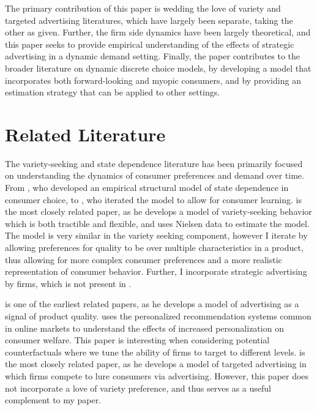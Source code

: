 \documentclass[12pt]{article}
\begin{document}
The primary contribution of this paper is wedding the love of variety and targeted advertising literatures, which have largely been separate, taking the other as given. Further, the firm side dynamics have been largely theoretical, and this paper seeks to provide empirical understanding of the effects of strategic advertising in a dynamic demand setting. Finally, the paper contributes to the broader literature on dynamic discrete choice models, by developing a model that incorporates both forward-looking and myopic consumers, and by providing an estimation strategy that can be applied to other settings.

\section{Related Literature}

    The variety-seeking and state dependence literature has been primarily focused on understanding the dynamics of consumer preferences and demand over time. From \cite{lattin_model_1987}, who developed an empirical structural model of state dependence in consumer choice, to \citet{erdem_decision-making_1996}, who iterated the model to allow for consumer learning. \cite{chintagunta_variety_1999} is the most closely related paper, as he develops a model of variety-seeking behavior which is both tractible and flexible, and uses Nielsen data to estimate the model. The model is very similar in the variety seeking component, however I iterate by allowing preferences for quality to be over multiple characteristics in a product, thus allowing for more complex consumer preferences and a more realistic representation of consumer behavior. Further, I incorporate strategic advertising by firms, which is not present in \cite{chintagunta_variety_1999}.

    \citet{nelson_information_1970} is one of the earliest related papers, as he develops a model of advertising as a signal of product quality. \cite{zielnicki_value_2025} uses the personalized recommendation systems common in online markets to understand the effects of increased personalization on consumer welfare. This paper is interesting when considering potential counterfactuals where we tune the ability of firms to target to different levels. \cite{shin_targeted_nodate} is the most closely related paper, as he develops a model of targeted advertising in which firms compete to lure consumers via advertising. However, this paper does not incorporate a love of variety preference, and thus serves as a useful complement to my paper.
\end{document}
